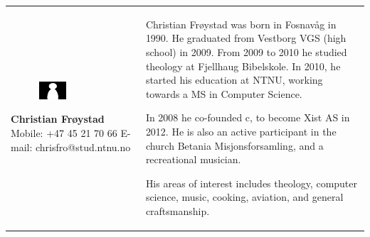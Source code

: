 \documentclass[11pt]{book}
\begin{document}
\begin{table}[H]
\centering
\begin{tabular}{ p{7cm} p{7cm} }
\parbox{7cm}{
\begin{figure}[H]
      \includegraphics[width=0.4\textwidth]{Figures/Person.png}
      \label{fig:partners_group_christian}
\end{figure}
\textbf{Christian Frøystad}\\
Mobile: +47 45 21 70 66\\
E-mail: chrisfro@stud.ntnu.no} & \parbox{7cm}{
Christian Frøystad was born in Fosnavåg in 1990. He graduated from Vestborg VGS (high school) in 2009. From 2009 to 2010 he studied theology at Fjellhaug Bibelskole.
In 2010, he started his education at NTNU, working towards a MS in Computer Science.

In 2008 he co-founded c, to become Xist AS in 2012.
He is also an active participant in the church Betania Misjonsforsamling, and a recreational musician.

His areas of interest includes theology, computer science, music, cooking, aviation, and general craftsmanship.
}
\end{tabular}
\label{tab:partners_group_christian}
\end{table}
\end{document}
